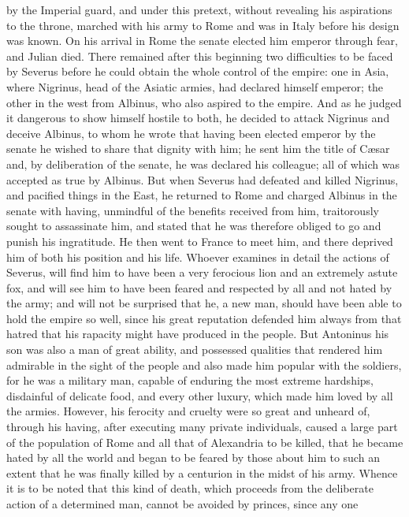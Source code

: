 \documentclass[12pt,letterpaper]{memoir}
\begin{document}
by the Imperial guard, and under this pretext, without revealing his
aspirations to the throne, marched with his army to Rome and was in
Italy before his design was known. On his arrival in Rome the senate
elected him emperor through fear, and Julian died. There remained
after this beginning two difficulties to be faced by Severus before
he could obtain the whole control of the empire: one in Asia, where
Nigrinus, head of the Asiatic armies, had declared himself emperor; the
other in the west from Albinus, who also aspired to the empire. And
as he judged it dangerous to show himself hostile to both, he decided
to attack Nigrinus and deceive Albinus, to whom he wrote that having
been elected emperor by the senate he wished to share that dignity
with him; he sent him the title of Cæsar and, by deliberation of the
senate, he was declared his colleague; all of which was accepted as
true by Albinus. But when Severus had defeated and killed Nigrinus,
and pacified things in the East, he returned to Rome and charged
Albinus in the senate with having, unmindful of the benefits received
from him, traitorously sought to assassinate him, and stated that he
was therefore obliged to go and punish his ingratitude. He then went
to France to meet him, and there deprived him of both his position
and his life. Whoever examines in detail the actions of Severus, will
find him to have been a very ferocious lion and an extremely astute
fox, and will see him to have been feared and respected by all and not
hated by the army; and will not be surprised that he, a new man, should
have been able to hold the empire so well, since his great reputation
defended him always from that hatred that his rapacity might have
produced in the people. But Antoninus his son was also a man of great
ability, and possessed qualities that rendered him admirable in the
sight of the people and also made him popular with the soldiers, for
he was a military man, capable of enduring the most extreme hardships,
disdainful of delicate food, and every other luxury, which made him
loved by all the armies. However, his ferocity and cruelty were so
great and unheard of, through his having, after executing many private
individuals, caused a large part of the population of Rome and all that
of Alexandria to be killed, that he became hated by all the world and
began to be feared by those about him to such an extent that he was
finally killed by a centurion in the midst of his army. Whence it is to
be noted that this kind of death, which proceeds from the deliberate
action of a determined man, cannot be avoided by princes, since any one
\end{document}
